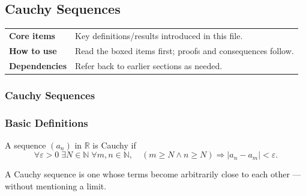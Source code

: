 
\subsection{Cauchy Sequences}

\begin{tcolorbox}[colback=gray!6, colframe=gray!40, arc=2pt,
  left=6pt, right=6pt, top=4pt, bottom=4pt,
  title={\small\textbf{Cauchy — Quick Reference}},
  fonttitle=\small\bfseries]
\begin{tabular}{@{}p{}p{}@{}}
\textbf{Core items} & Key definitions/results introduced in this file.\\
\textbf{How to use} & Read the boxed items first; proofs and consequences follow.\\
\textbf{Dependencies} & Refer back to earlier sections as needed.\\
\end{tabular}
\end{tcolorbox}


\subsubsection{Cauchy Sequences}

\subsubsection{Basic Definitions}

\begin{tcolorbox}[colback=propbox, colframe=propborder, arc=2pt,
  left=6pt, right=6pt, top=4pt, bottom=4pt,
  title={\small\textbf{Definition (Cauchy sequence)}},
  fonttitle=\small\bfseries]
A sequence $(a_n)$ in $\mathbb{R}$ is Cauchy if
\[
\forall \varepsilon > 0 \;\exists N \in \mathbb{N}
\;\forall m,n \in \mathbb{N},
\quad
(m \ge N \land n \ge N)
\Rightarrow
|a_n - a_m| < \varepsilon.
\]
\end{tcolorbox}

\begin{remark}
    A Cauchy sequence is one whose terms become arbitrarily close to each other —
without mentioning a limit.
\end{remark}

